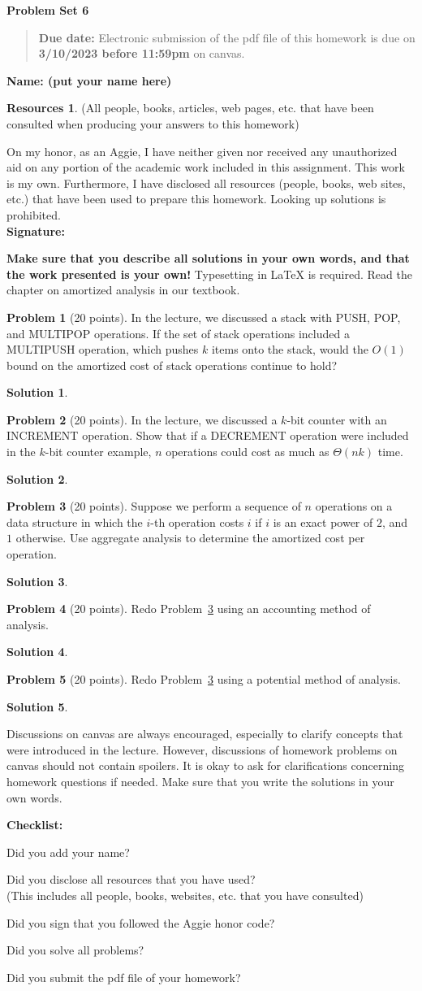\documentclass{article}
\theoremstyle{definition}
\newtheorem{problem}{Problem}
\newtheorem*{solution}{Solution}
\newtheorem*{resources}{Resources}
\newcommand{\name}[1]{\noindent\textbf{Name: #1}}
\newcommand{\honor}{\noindent On my honor, as an Aggie, I have neither
  given nor received any unauthorized aid on any portion of the
  academic work included in this assignment. This work is my own. Furthermore, I have
  disclosed all resources (people, books, web sites, etc.) that have
  been used to prepare this homework. Looking up solutions is prohibited. \\[1ex]
 \textbf{Signature:} \underline{\hspace*{5cm}} }
\newcommand{\checklist}{\noindent\textbf{Checklist:}
\begin{compactitem}[$\Box$] 
\item Did you add your name? 
\item Did you disclose all resources that you have used? \\
(This includes all people, books, websites, etc. that you have consulted)
\item Did you sign that you followed the Aggie honor code? 
\item Did you solve all problems? 
\item Did you submit the pdf file of your homework?
\end{compactitem}
}
\newcommand{\problemset}[1]{\begin{center}\textbf{Problem Set
      #1}\end{center}}
\newcommand{\duedate}[1]{\begin{quote}\textbf{Due date:} Electronic
    submission of the pdf file of this homework is due on
    \textbf{#1} on canvas. \end{quote} }
\begin{document}
\problemset{6}
\duedate{3/10/2023 before 11:59pm}
\name{ (put your name here)}
\begin{resources} (All people, books, articles, web pages, etc. that
  have been consulted when producing your answers to this homework)
\end{resources}
\honor

\newpage
\textbf{Make sure that you describe all solutions in your own
words, and that the work presented is your own!} Typesetting in
\LaTeX{} is required. Read the chapter on amortized analysis in our textbook. 

\begin{problem}[20 points] In the lecture, we discussed a stack with
  PUSH, POP, and MULTIPOP operations.  If the set of stack operations
  included a MULTIPUSH operation, which pushes $k$ items onto the
  stack, would the $O(1)$ bound on the amortized cost of stack
  operations continue to hold?
\end{problem}
\begin{solution}
\end{solution}

\begin{problem}[20 points]
  In the lecture, we discussed a $k$-bit counter with an INCREMENT
  operation.  Show that if a DECREMENT operation were included in the $k$-bit
  counter example, $n$ operations could cost as much as $\Theta(nk)$
  time.
\end{problem}
\begin{solution}
\end{solution}

\begin{problem}[20 points] \label{base}
  Suppose we perform a sequence of $n$ operations on a data structure
  in which the $i$-th operation costs $i$ if $i$ is an exact power of
  $2$, and $1$ otherwise. Use aggregate analysis to determine the
  amortized cost per operation.
\end{problem}
\begin{solution}
\end{solution}

\begin{problem}[20 points]
 Redo Problem~\ref{base} using an accounting method of analysis.
\end{problem}
\begin{solution}
\end{solution}

\begin{problem}[20 points]
Redo Problem~\ref{base} using a potential method of analysis.
\end{problem}
\begin{solution}
\end{solution}


Discussions on canvas are always encouraged, especially to clarify
concepts that were introduced in the lecture. However, discussions of
homework problems on canvas should not contain spoilers. It is okay to
ask for clarifications concerning homework questions if needed. Make
sure that you write the solutions in your own words. 


\medskip



\goodbreak
\checklist
\end{document}
